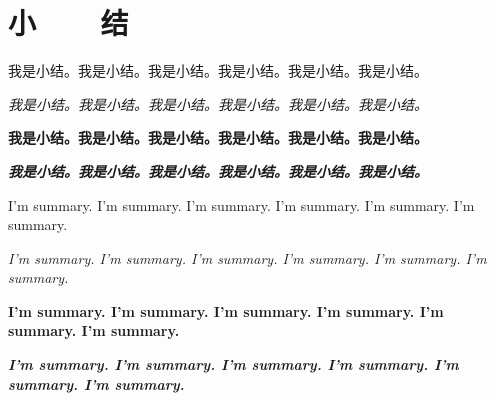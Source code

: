 \chapter{小~~~~结}

我是小结。我是小结。我是小结。我是小结。我是小结。我是小结。

\textit{我是小结。我是小结。我是小结。我是小结。我是小结。我是小结。}

\textbf{我是小结。我是小结。我是小结。我是小结。我是小结。我是小结。}

\textbf{\textit{我是小结。我是小结。我是小结。我是小结。我是小结。我是小结。}}

I'm summary. I'm summary. I'm summary. I'm summary. I'm summary. I'm summary. 

\textit{I'm summary. I'm summary. I'm summary. I'm summary. I'm summary. I'm summary. }

\textbf{I'm summary. I'm summary. I'm summary. I'm summary. I'm summary. I'm summary. }

\textbf{\textit{I'm summary. I'm summary. I'm summary. I'm summary. I'm summary. I'm summary. }}

\clearpage